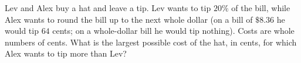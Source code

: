 Lev and Alex buy a hat and leave a tip. Lev wants to tip $20\%$ of the bill, while Alex wants to round the bill up to the next whole dollar (on a bill of $\$8.36$ he would tip $64$ cents; on a whole-dollar bill he would tip nothing). Costs are whole numbers of cents. What is the largest possible cost of the hat, in cents, for which Alex wants to tip more than Lev?
